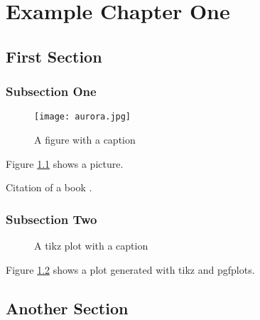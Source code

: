 \chapter{Example Chapter One}

\section{First Section}

\subsection{Subsection One}

\begin{figure}
\centering
\texttt{[image: aurora.jpg]}
\caption{A figure with a caption}
\label{fig:aurora}
\end{figure}

Figure \ref{fig:aurora} shows a picture.

Citation of a book \cite{hartley2004}.

\lipsum[1-2]

\subsection{Subsection Two}

\begin{figure}
\centering

\caption{A tikz plot with a caption}
\label{fig:plot}
\end{figure}

Figure \ref{fig:plot} shows a plot generated with tikz and pgfplots.

\lipsum[4-5]

\section{Another Section}

\lipsum[6-12]